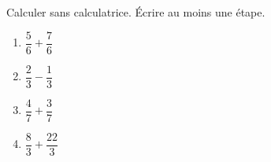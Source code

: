 \documentclass[exercice]{thedocument}%
\begin{document}
%
Calculer sans calculatrice. Écrire au moins une étape.
\begin{enumerate}
    \item $\dfrac56+\dfrac76$
    \item $\dfrac23-\dfrac13$
    \item $\dfrac47+\dfrac37$
    \item $\dfrac83+\dfrac{22}3$
\end{enumerate}
\end{document}
